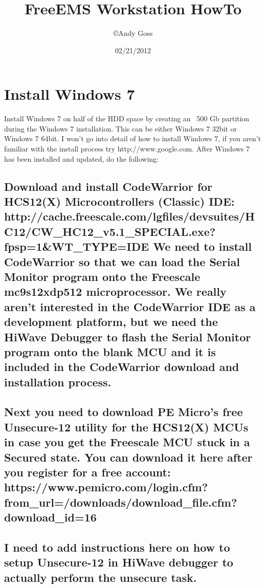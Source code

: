 ﻿\documentclass[12pt]{article}
\title{FreeEMS Workstation HowTo}
\author{\copyright Andy Goss}
\date{02/21/2012}
\begin{document}
  \maketitle
{}
\section{Install Windows 7} Install Windows 7 on half of the HDD space by creating an ~500 Gb partition during the Windows 7 installation.
This can be either Windows 7 32bit or Windows 7 64bit.  I won't go into detail of how to install Windows 7, if you aren't familiar with the install process try http://www.google.com.  After Windows 7 has been installed and updated, do the following:
\subsection{Download and install CodeWarrior for HCS12(X) Microcontrollers (Classic) IDE: http://cache.freescale.com/lgfiles/devsuites/HC12/CW_HC12_v5.1_SPECIAL.exe?fpsp=1&WT_TYPE=IDE%
We need to install CodeWarrior so that we can load the Serial Monitor program onto the Freescale mc9s12xdp512 microprocessor.  We really aren't interested in the CodeWarrior IDE as a development platform, but we need the HiWave Debugger to flash the Serial Monitor program onto the blank MCU and it is included in the CodeWarrior download and installation process.}

\subsection{Next you need to download PE Micro's free Unsecure-12 utility for the HCS12(X) MCUs in case you get the Freescale MCU stuck in a Secured state. You can download it here after you register for a free account: https://www.pemicro.com/login.cfm?from_url=/downloads/download_file.cfm?download_id=16}
\subsection{I need to add instructions here on how to setup Unsecure-12 in HiWave debugger to actually perform the unsecure task.}
\end{document}
